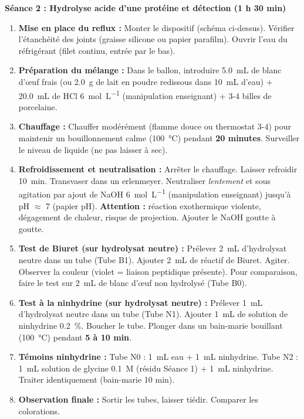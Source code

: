 \documentclass[11pt]{article}
\begin{document}
\textbf{Séance 2 : Hydrolyse acide d'une protéine et détection (1 h 30 min)}
\begin{enumerate}
    \item \textbf{Mise en place du reflux :} Monter le dispositif (schéma ci-dessus). Vérifier l'étanchéité des joints (graisse silicone ou papier parafilm). Ouvrir l'eau du réfrigérant (filet continu, entrée par le bas).
    \item \textbf{Préparation du mélange :} Dans le ballon, introduire \SI{5,0}{mL} de blanc d'œuf frais (ou \SI{2,0}{g} de lait en poudre redissous dans \SI{10}{mL} d'eau) + \SI{20,0}{mL} de HCl \SI{6}{mol.L^{-1}} (manipulation enseignant) + 3-4 billes de porcelaine.
    \item \textbf{Chauffage :} Chauffer modérément (flamme douce ou thermostat 3-4) pour maintenir un bouillonnement calme (\SI{100}{\celsius}) pendant \textbf{20 minutes}. Surveiller le niveau de liquide (ne pas laisser à sec).
    \item \textbf{Refroidissement et neutralisation :} Arrêter le chauffage. Laisser refroidir \SI{10}{min}. Transvaser dans un erlenmeyer. Neutraliser \emph{lentement} et sous agitation par ajout de NaOH \SI{6}{mol.L^{-1}} (manipulation enseignant) jusqu'à pH $\approx$ 7 (papier pH). \textbf{Attention :} réaction exothermique violente, dégagement de chaleur, risque de projection. Ajouter le NaOH goutte à goutte.
    \item \textbf{Test de Biuret (sur hydrolysat neutre) :} Prélever \SI{2}{mL} d'hydrolysat neutre dans un tube (Tube B1). Ajouter \SI{2}{mL} de réactif de Biuret. Agiter. Observer la couleur (violet = liaison peptidique présente). Pour comparaison, faire le test sur \SI{2}{mL} de blanc d'œuf non hydrolysé (Tube B0).
    \item \textbf{Test à la ninhydrine (sur hydrolysat neutre) :} Prélever \SI{1}{mL} d'hydrolysat neutre dans un tube (Tube N1). Ajouter \SI{1}{mL} de solution de ninhydrine \SI{0,2}{\%}. Boucher le tube. Plonger dans un bain-marie bouillant (\SI{100}{\celsius}) pendant \textbf{5 à 10 min}.
    \item \textbf{Témoins ninhydrine :} Tube N0 : \SI{1}{mL} eau + \SI{1}{mL} ninhydrine. Tube N2 : \SI{1}{mL} solution de glycine \SI{0,1}{M} (résidu Séance 1) + \SI{1}{mL} ninhydrine. Traiter identiquement (bain-marie 10 min).
    \item \textbf{Observation finale :} Sortir les tubes, laisser tiédir. Comparer les colorations.
\end{enumerate}
\end{document}
